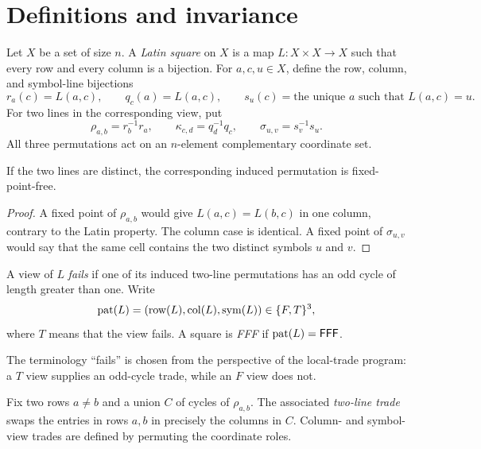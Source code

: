 \section{Definitions and invariance}

Let $X$ be a set of size $n$.  A \emph{Latin square} on $X$ is a map
$L\colon X\times X\to X$ such that every row and every column is a bijection.
For $a,c,u\in X$, define the row, column, and symbol-line bijections
\[
 r_a(c)=L(a,c),\qquad
 q_c(a)=L(a,c),\qquad
 s_u(c)=\text{the unique }a\text{ such that }L(a,c)=u.
\]
For two lines in the corresponding view, put
\[
 \rho_{a,b}=r_b^{-1}r_a,\qquad
 \kappa_{c,d}=q_d^{-1}q_c,\qquad
 \sigma_{u,v}=s_v^{-1}s_u.
\]
All three permutations act on an $n$-element complementary coordinate set.

\begin{lemma}\label{lem:fixed-point-free}
If the two lines are distinct, the corresponding induced permutation is
fixed-point-free.
\end{lemma}

\begin{proof}
A fixed point of $\rho_{a,b}$ would give $L(a,c)=L(b,c)$ in one column,
contrary to the Latin property.  The column case is identical.  A fixed point
of $\sigma_{u,v}$ would say that the same cell contains the two distinct
symbols $u$ and $v$.
\end{proof}

\begin{definition}
A view of $L$ \emph{fails} if one of its induced two-line permutations has an
odd cycle of length greater than one.  Write
\[
 \operatorname{pat}(L)=(\mathrm{row}(L),\mathrm{col}(L),\mathrm{sym}(L))\in\{F,T\}^3,
\]
where $T$ means that the view fails.  A square is \emph{FFF} if
$\operatorname{pat}(L)=\mathsf{FFF}$.
\end{definition}

The terminology ``fails'' is chosen from the perspective of the local-trade
program: a $T$ view supplies an odd-cycle trade, while an $F$ view does not.

\begin{definition}
Fix two rows $a\ne b$ and a union $C$ of cycles of $\rho_{a,b}$.  The
associated \emph{two-line trade} swaps the entries in rows $a,b$ in precisely
the columns in $C$.  Column- and symbol-view trades are defined by permuting
the coordinate roles.
\end{definition}

